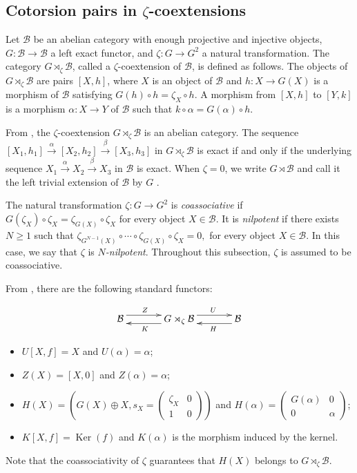 \documentclass[11pt,reqno]{amsart}
\numberwithin{equation}{section}
\newcommand{\cB}{\mathcal B}
\newcommand{\Ker}{\operatorname{Ker}}
\begin{document}
\subsection{Cotorsion pairs in \texorpdfstring{$\zeta$}{zeta}-coextensions}
Let $\cB$ be an abelian category with enough projective and injective objects, $G\colon\cB\to\cB$ a left exact functor, and $\zeta\colon G\to G^2$ a natural transformation. The category $G\rtimes_\zeta\cB$, called a $\zeta$-coextension of $\cB$, is defined as follows. The objects of $G\rtimes_\zeta\cB$ are pairs $[X,h]$, where $X$ is an object of $\cB$ and $h\colon X\to G(X)$ is a morphism of $\cB$ satisfying
$
G(h)\circ h=\zeta_X\circ h.
$
A morphism from $[X,h]$ to $[Y,k]$ is a morphism $\alpha\colon X\to Y$ of $\cB$ such that
$
k\circ \alpha=G(\alpha)\circ h.
$

From \cite{Marmaridis}, the $\zeta$-coextension $G\rtimes_\zeta\cB$ is an abelian category. The sequence
$[X_1,h_1]\xrightarrow{\alpha} [X_2,h_2]\xrightarrow{\beta} [X_3,h_3]$ in $G\rtimes_\zeta\cB$ is exact if and only if the underlying sequence
$X_1\xrightarrow{\alpha} X_2\xrightarrow{\beta} X_3$ in $\cB$ is exact. When $\zeta=0$, we write $G\rtimes\cB$ and call it the left trivial extension of $\cB$ by $G$ \cite{FossumGriffithReiten}.

The natural transformation $\zeta\colon G\to G^2$ is \emph{coassociative} if
$
G(\zeta_X)\circ \zeta_X=\zeta_{G(X)}\circ\zeta_X
$
for every object $X\in\cB$. It is \emph{nilpotent} if there exists $N\ge1$ such that
$
\zeta_{G^{N-1}(X)}\circ\cdots\circ\zeta_{G(X)}\circ\zeta_{X}=0,
$
for every object $X\in\cB$. In this case, we say that $\zeta$ is \emph{$N$-nilpotent}. Throughout this subsection, $\zeta$ is assumed to be coassociative.

From \cite{Beligiannis}, there are the following standard functors:

\[
\xymatrix@C=3pc{
\cB \ar@<1ex>[r]^{Z\ \ \ } & G\rtimes_\zeta\cB \ar@<1ex>[l]^{K\ \ \ } \ar@<1ex>[r]^{\ \ \ U}
& \cB \ar@<1ex>[l]^{\ \ \ H}
}
\]

\begin{itemize}
 	\item $U[X,f]=X$ and $U(\alpha)=\alpha$;
 	\item $Z(X)=[X,0]$ and $Z(\alpha)=\alpha$;
 	\item $H(X)=\left(G(X)\oplus X, s_X =\left(\begin{smallmatrix}
 		\zeta_X &0\\
 		1&0
 	\end{smallmatrix}\right)\right)$ and $H(\alpha)=\begin{pmatrix}
 	G(\alpha)&0\\
 	0& \alpha
 	\end{pmatrix}$;
 	\item $K[X,f]=\Ker(f)$ and $K(\alpha)$ is the morphism induced by the kernel.
 \end{itemize}
Note that the coassociativity of $\zeta$ guarantees that
$H(X)$ belongs to $G\rtimes_\zeta \cB$.
\end{document}
